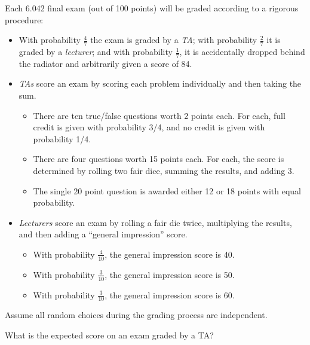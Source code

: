 \documentclass[12pt,twoside]{article}
\begin{document}
\begin{problem}{13}
Each 6.042 final exam (out of 100 points) will be graded according to a rigorous procedure:
\begin{itemize}

\item With probability $\frac{4}{7}$ the exam is graded by a {\em TA}; with
probability $\frac{2}{7}$ it is graded by a {\em lecturer}; and with
probability $\frac{1}{7}$, it is accidentally dropped behind the radiator
and arbitrarily given a score of 84.

\item {\em TAs} score an exam by scoring each problem individually and
then taking the sum.

\begin{itemize}
\item There are ten true/false questions worth 2 points each.  For each,
full credit is given with probability 3/4, and no credit is
given with probability 1/4.

\item There are four questions worth 15 points each.  For each, the score
is determined by rolling two fair dice, summing the results, and adding 3.

\item The single 20 point question is awarded either 12 or 18 points with
equal probability.
\end{itemize}

\item {\em Lecturers} score an exam by rolling a fair die twice,
multiplying the results, and then adding a ``general impression'' score.

\begin{itemize}
\item With probability $\frac{4}{10}$, the general impression score is 40.
\item With probability $\frac{3}{10}$, the general impression score is 50.
\item With probability $\frac{3}{10}$, the general impression score is 60.
\end{itemize}
\end{itemize}
Assume all random choices during the grading process are independent.

\bparts

 What is the expected score on an exam graded by a TA?


\end{problem}
\end{document}

